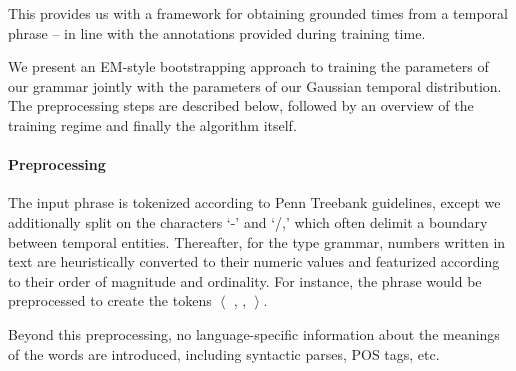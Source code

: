 This provides us with a framework for obtaining grounded times from a
	temporal phrase -- in line with the annotations provided during training
	time.


We present an EM-style bootstrapping approach to training the 
	parameters of our grammar jointly with the parameters of our 
	Gaussian temporal distribution.
The preprocessing steps are described below, followed by an overview
	of the training regime and finally the algorithm itself.

\paragraph{Preprocessing}
The input phrase is tokenized according to Penn Treebank guidelines,
	except we additionally split on the characters `-' and `/,' which
	often delimit a boundary between temporal entities.
Thereafter, for the type grammar, 
	numbers written in text are heuristically converted to their
	numeric values and featurized according to their order of magnitude
	and ordinality.
For instance, the phrase  would be preprocessed to create the
	tokens $\left<\right.$  , \tp{-} ,  
		$\left.\right>$.

Beyond this preprocessing, no language-specific information about the meanings
	of the words are introduced, including syntactic parses, POS tags, etc.


